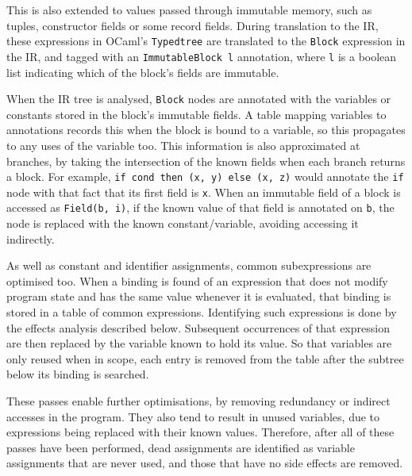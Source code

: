 This is also extended to values passed through immutable memory, such as tuples, constructor fields or some record fields. During translation to the IR, these expressions in OCaml's \verb|Typedtree| are translated to the \verb|Block| expression in the IR, and tagged with an \verb|ImmutableBlock l| annotation, where \verb|l| is a boolean list indicating which of the block's fields are immutable. 


When the IR tree is analysed, \verb|Block| nodes are annotated with the variables or constants stored in the block's immutable fields.
 A table mapping variables to annotations records this when the block is bound to a variable, so this propagates to any uses of the variable too. 
This information is also approximated at branches, by taking the intersection of the known fields when each branch returns a block. For example, \verb|if cond then (x, y) else (x, z)| would annotate the \verb|if| node with that fact that its first field is \verb|x|. 
When an immutable field of a block is accessed as \verb|Field(b, i)|, if the known value of that field is annotated on \verb|b|, the node is replaced with the known constant/variable, avoiding accessing it indirectly.


As well as constant and identifier assignments, common subexpressions are optimised too. When a binding is found of an expression that does not modify program state and has the same value whenever it is evaluated, that binding is stored in a table of common expressions. Identifying such expressions is done by the effects analysis described below. 
Subsequent occurrences of that expression are then replaced by the variable known to hold its value. So that variables are only reused when in scope, each entry is removed from the table after the subtree below its binding is searched.

These passes enable further optimisations, by removing redundancy or indirect accesses in the program. They also tend to result in unused variables, due to expressions being replaced with their known values.  Therefore, after all of these passes have been performed,  dead assignments are identified as variable assignments that are never used, and those that have no side effects are removed.



